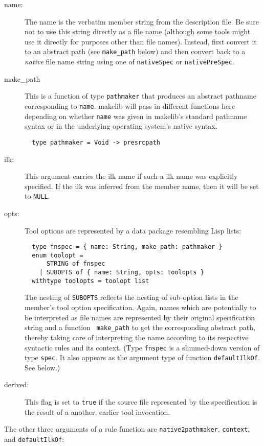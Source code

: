 \begin{description}
\item[name:] The name is the verbatim member string from the
description file.  Be sure not to use this string directly as a file
name (although some tools might use it directly for purposes other
than file names).  Instead, first convert it to an abstract path (see
{\tt make_path} below) and then convert back to a {\em native} file name
string using one of {\tt nativeSpec} or {\tt nativePreSpec}.
\item[make_path] This is a function of type {\tt pathmaker} that produces
an abstract pathname corresponding to {\tt name}.  makelib will pass in different
functions here depending on whether {\tt name} was given in makelib's
standard pathname syntax or in the underlying operating system's
native syntax.
\begin{verbatim}
  type pathmaker = Void -> presrcpath
\end{verbatim}
\item[ilk:] This argument carries the ilk name if such a ilk
name was explicitly specified.  If the ilk was inferred from the
member name, then it will be set to {\tt NULL}.
\item[opts:] Tool options are represented by a data package
resembling Lisp lists:
\begin{verbatim}
  type fnspec = { name: String, make_path: pathmaker }
  enum toolopt =
      STRING of fnspec
    | SUBOPTS of { name: String, opts: toolopts }
  withtype toolopts = toolopt list
\end{verbatim}
The nesting of {\tt SUBOPTS} reflects the nesting of sub-option lists
in the member's tool option specification.
Again, names which are potentially to be interpreted as file names are
represented by their original specification string and a function {\tt
make_path} to get the corresponding abstract path, thereby taking
care of interpreting the name according to its respective syntactic
rules and its context. (Type {\tt fnspec} is a slimmed-down version of
type {\tt spec}.  It also appears as the argument type of function
{\tt defaultIlkOf}.  See below.)
\item[derived:] This flag is set to {\tt true} if the source file
represented by the specification is the result of a another, earlier
tool invocation.
\end{description}

The other three arguments of a rule function are {\tt native2pathmaker},
{\tt context}, and {\tt defaultIlkOf}:

